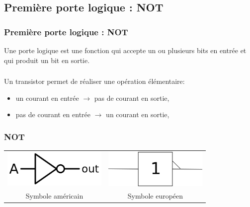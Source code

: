 \documentclass[svgnames,11pt]{beamer}
\begin{document}
\subsection{Première porte logique : NOT}
\begin{frame}
    \frametitle{Première porte logique : NOT}

    \begin{aretenir}[]
        Une porte logique est une fonction qui accepte un ou plusieurs bits en entrée et qui produit un bit
        en sortie.
    \end{aretenir}

\end{frame}
\begin{frame}
    \frametitle{}
    Un transistor permet de réaliser une opération élémentaire:
    \begin{itemize}
        \item un courant en entrée $\rightarrow$ pas de courant en sortie,
        \item pas de courant en entrée $\rightarrow$ un courant en sortie,
    \end{itemize}


\end{frame}
\begin{frame}
    \frametitle{NOT}

    \begin{center}
        \begin{tabular}{cc}
            \includegraphics[width=5cm]{ressources/not-us.png}
                              &
            \includegraphics[width=5cm]{ressources/not-eu.png} \\
            Symbole américain & Symbole européen               \\
        \end{tabular}
    \end{center}

\end{frame}
\end{document}
